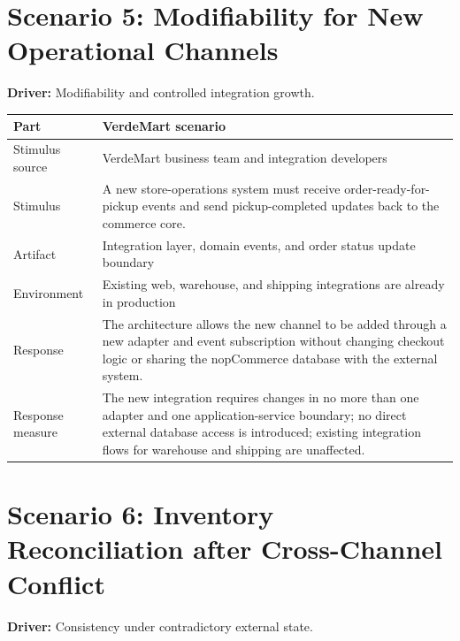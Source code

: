 \section{Scenario 5: Modifiability for New Operational Channels}

\textbf{Driver:} Modifiability and controlled integration growth.

\begin{center}
\begin{tabular}{|p{}|p{}|}
\hline
\textbf{Part} & \textbf{VerdeMart scenario} \\
\hline
Stimulus source & VerdeMart business team and integration developers \\
\hline
Stimulus & A new store-operations system must receive order-ready-for-pickup events and send pickup-completed updates back to the commerce core. \\
\hline
Artifact & Integration layer, domain events, and order status update boundary \\
\hline
Environment & Existing web, warehouse, and shipping integrations are already in production \\
\hline
Response & The architecture allows the new channel to be added through a new adapter and event subscription without changing checkout logic or sharing the nopCommerce database with the external system. \\
\hline
Response measure & The new integration requires changes in no more than one adapter and one application-service boundary; no direct external database access is introduced; existing integration flows for warehouse and shipping are unaffected. \\
\hline
\end{tabular}
\end{center}

\section{Scenario 6: Inventory Reconciliation after Cross-Channel Conflict}

\textbf{Driver:} Consistency under contradictory external state.

